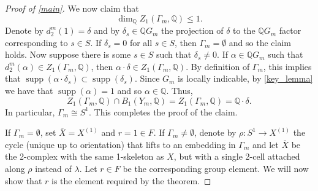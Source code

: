 \documentclass{amsart}
\theoremstyle{definition}
\DeclareMathOperator{\supp}{supp}
\newcommand{\Q}{\mathbb{Q}}
\newcommand{\isom}{\cong}
\begin{document}
\begin{proof}[Proof of \cref{main}]
We now claim that 
\[
\dim_{\Q}Z_1(\Gamma_m, \Q) \leqslant 1.
\]
Denote by $d_2^m(1) = \delta$ and by $\delta_s\in \Q G_m$ the projection of $\delta$ to the $\Q G_m$ factor corresponding to $s\in S$. If $\delta_s = 0$ for all $s\in S$, then $\Gamma_m = \emptyset$ and so the claim holds. Now suppose there is some $s\in S$ such that $\delta_s \neq 0$. If $\alpha\in \Q G_m$ such that $d_2^m(\alpha)\in Z_1(\Gamma_m, \Q)$, then $\alpha\cdot \delta\in Z_1(\Gamma_m, \Q)$. By definition of $\Gamma_m$, this implies that $\supp(\alpha\cdot\delta_s)\subset \supp(\delta_s)$. Since $G_m$ is locally indicable, by \cref{key_lemma} we have that $\supp(\alpha) = 1$ and so $\alpha\in \Q$. Thus, 
\[
Z_1(\Gamma_m, \Q)\cap B_1(Y_m, \Q) = Z_1(\Gamma_m, \Q) = \Q\cdot \delta.
\]
In particular, $\Gamma_m\isom S^1$. This completes the proof of the claim.

If $\Gamma_m = \emptyset$, set $\overline{X} = X^{(1)}$ and $r = 1\in F$. If $\Gamma_m\neq\emptyset$, denote by $\rho\colon S^1\to X^{(1)}$ the cycle (unique up to orientation) that lifts to an embedding in $\Gamma_m$ and let $\overline{X}$ be the 2-complex with the same 1-skeleton as $X$, but with a single 2-cell attached along $\rho$ instead of $\lambda$. Let $r\in F$ be the corresponding group element. We will now show that $r$ is the element required by the theorem.


\end{proof}
\end{document}
